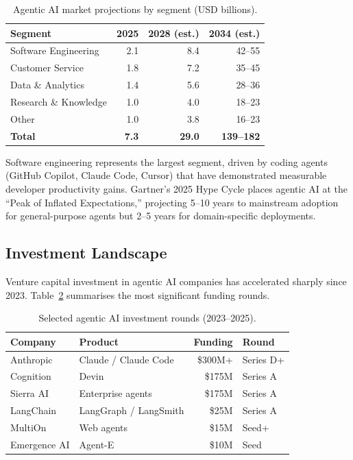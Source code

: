 \documentclass[12pt, a4paper]{article}
\begin{document}
\begin{table}[ht]
\centering
\caption{Agentic AI market projections by segment (USD billions).}
\label{tab:market}
\begin{tabular}{lrrr}
\toprule
\textbf{Segment} & \textbf{2025} & \textbf{2028 (est.)} & \textbf{2034 (est.)} \\
\midrule
Software Engineering    & 2.1  & 8.4   & 42--55 \\
Customer Service        & 1.8  & 7.2   & 35--45 \\
Data \& Analytics       & 1.4  & 5.6   & 28--36 \\
Research \& Knowledge   & 1.0  & 4.0   & 18--23 \\
Other                   & 1.0  & 3.8   & 16--23 \\
\midrule
\textbf{Total}          & \textbf{7.3} & \textbf{29.0} & \textbf{139--182} \\
\bottomrule
\end{tabular}
\end{table}

Software engineering represents the largest segment, driven by coding agents (GitHub Copilot, Claude Code, Cursor) that have demonstrated measurable developer productivity gains. Gartner's 2025 Hype Cycle places agentic AI at the ``Peak of Inflated Expectations,'' projecting 5--10 years to mainstream adoption for general-purpose agents but 2--5 years for domain-specific deployments.

\subsection{Investment Landscape}
Venture capital investment in agentic AI companies has accelerated sharply since 2023. Table~\ref{tab:investment} summarises the most significant funding rounds.

\begin{table}[ht]
\centering
\caption{Selected agentic AI investment rounds (2023--2025).}
\label{tab:investment}
\begin{tabular}{llrl}
\toprule
\textbf{Company} & \textbf{Product} & \textbf{Funding} & \textbf{Round} \\
\midrule
Anthropic     & Claude / Claude Code  & \$300M+   & Series D+ \\
Cognition     & Devin                 & \$175M    & Series A \\
Sierra AI     & Enterprise agents     & \$175M    & Series A \\
LangChain     & LangGraph / LangSmith & \$25M     & Series A \\
MultiOn       & Web agents            & \$15M     & Seed+ \\
Emergence AI  & Agent-E               & \$10M     & Seed \\
\bottomrule
\end{tabular}
\end{table}
\end{document}
